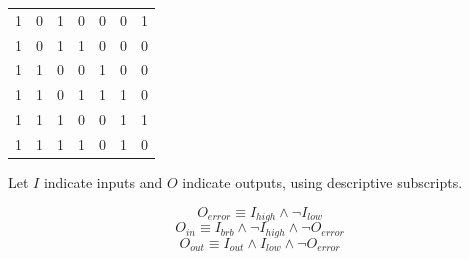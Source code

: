 \documentclass[11pt]{article}
\begin{document}
\begin{table}[h!]
\begin{tabular}{llll|lll}
        1                                    & 0                                    & 1                 & 0                & 0        & 0         & 1     \\
        1                                    & 0                                    & 1                 & 1                & 0        & 0         & 0     \\
        1                                    & 1                                    & 0                 & 0                & 1        & 0         & 0     \\
        1                                    & 1                                    & 0                 & 1                & 1        & 1         & 0     \\
        1                                    & 1                                    & 1                 & 0                & 0        & 1         & 1     \\
        1                                    & 1                                    & 1                 & 1                & 0        & 1         & 0
    \end{tabular}
\end{table}

Let $I$ indicate inputs and $O$ indicate outputs, using descriptive subscripts.

\begin{equation}
    O_{error} \equiv I_{high} \land \lnot I_{low}
\end{equation}
\begin{equation}
    O_{in} \equiv I_{brb} \land \lnot I_{high} \land \lnot O_{error}
\end{equation}
\begin{equation}
    O_{out} \equiv I_{out} \land I_{low} \land \lnot O_{error}
\end{equation}
\end{document}
